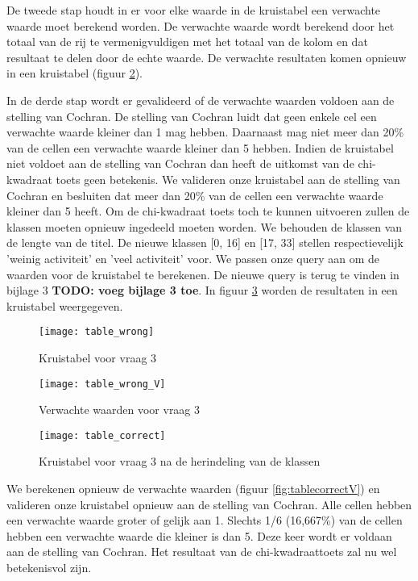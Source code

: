 De tweede stap houdt in er voor elke waarde in de kruistabel een verwachte waarde moet berekend worden. De verwachte waarde wordt berekend door het totaal van de rij te vermenigvuldigen met het totaal van de kolom en dat resultaat te delen door de echte waarde. De verwachte resultaten komen opnieuw in een kruistabel (figuur \ref{fig:tablewrongV}).

In de derde stap wordt er gevalideerd of de verwachte waarden voldoen aan de stelling van Cochran. De stelling van Cochran luidt dat geen enkele cel een verwachte waarde kleiner dan 1 mag hebben. Daarnaast mag niet meer dan 20\% van de cellen een verwachte waarde kleiner dan 5 hebben. Indien de kruistabel niet voldoet aan de stelling van Cochran dan heeft de uitkomst van de chi-kwadraat toets geen betekenis. We valideren onze kruistabel aan de stelling van Cochran en besluiten dat meer dan 20\% van de cellen een verwachte waarde kleiner dan 5 heeft. Om de chi-kwadraat toets toch te kunnen uitvoeren zullen de klassen moeten opnieuw ingedeeld moeten worden. We behouden de klassen van de lengte van de titel. De nieuwe klassen [0, 16] en [17, 33] stellen respectievelijk 'weinig activiteit' en 'veel activiteit' voor. We passen onze query aan om de waarden voor de kruistabel te berekenen. De nieuwe query is terug te vinden in bijlage 3 \textbf{TODO: voeg bijlage 3 toe}. In figuur \ref{fig:tablecorrect} worden de resultaten in een kruistabel weergegeven.


\begin{figure}
	\centering
	\texttt{[image: table\_wrong]}
	\caption{Kruistabel voor vraag 3}
	\label{fig:tablewrong}
\end{figure}

\begin{figure}
	\centering
	\texttt{[image: table\_wrong\_V]}
	\caption{Verwachte waarden voor vraag 3}
	\label{fig:tablewrongV}
\end{figure}

\begin{figure}
	\centering
	\texttt{[image: table\_correct]}
	\caption{Kruistabel voor vraag 3 na de herindeling van de klassen}
	\label{fig:tablecorrect}
\end{figure}

We berekenen opnieuw de verwachte waarden (figuur \ref{fig:tablecorrectV}) en valideren onze kruistabel opnieuw aan de stelling van Cochran. Alle cellen hebben een verwachte waarde groter of gelijk aan 1. Slechts 1/6 (16,667\%) van de cellen hebben een verwachte waarde die kleiner is dan 5. Deze keer wordt er voldaan aan de stelling van Cochran. Het resultaat van de chi-kwadraattoets zal nu wel betekenisvol zijn.


